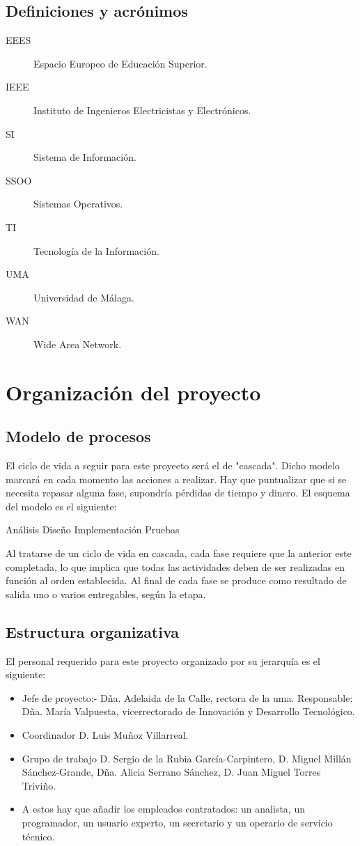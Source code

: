 \documentclass[11pt,a4paper,spanish,twoside]{report}
\begin{document}
\section{Definiciones y acrónimos}
\begin{description}
\item[EEES] Espacio Europeo de Educación Superior.
\item[IEEE] Instituto de Ingenieros Electricistas y Electrónicos.
\item[SI] Sistema de Información.
\item[SSOO] Sistemas Operativos.
\item[TI] Tecnología de la Información.
\item[UMA] Universidad de Málaga.
\item[WAN] Wide Area Network.
\end{description}

\chapter{Organización del proyecto}
\section{Modelo de procesos}
El ciclo de vida a seguir para este proyecto será el de "cascada". Dicho 
modelo marcará en cada momento las acciones a realizar. Hay que puntualizar 
que si se necesita repasar alguna fase, supondría pérdidas de tiempo y dinero.
El esquema del modelo es el siguiente:

Análisis
    Diseño
        Implementación
            Pruebas

Al tratarse de un ciclo de vida en cascada, cada fase requiere que la anterior 
este completada, lo que implica que todas las actividades deben de ser 
realizadas en función al orden establecida. Al final de cada fase se produce 
como resultado de salida uno o varios entregables, según la etapa.

\section{Estructura organizativa}
El personal requerido para este proyecto organizado por su jerarquía es el 
siguiente:
\begin{itemize}
\item Jefe de proyecto:- Dña. Adelaida de la Calle, rectora de la uma.
  Responsable: Dña. María Valpuesta, vicerrectorado de Innovación y Desarrollo 
  Tecnológico.
\item Coordinador D. Luis Muñoz Villarreal.
\item Grupo de trabajo D. Sergio de la Rubia García-Carpintero, D. Miguel 
  Millán Sánchez-Grande, Dña. Alicia Serrano Sánchez, D. Juan Miguel Torres 
  Triviño. 
\item A estos hay que añadir los empleados contratados: un analista, un 
  programador, un usuario experto, un secretario y un operario de servicio 
  técnico.
\end{itemize}
\end{document}
